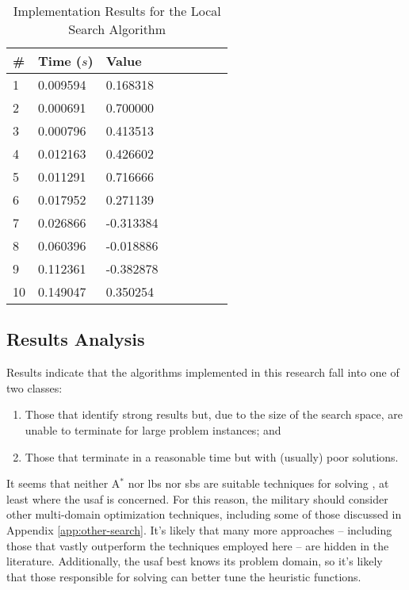 \documentclass[../main.tex]{subfiles}
\begin{document}
\begin{table*}
\caption{Implementation Results for the Local Search Algorithm}
\centering
\label{tab:loc-results}
\begin{tabular}{|l|l|l|l|l|l|l|l|}
\hline
\# & Time ($s$) & Value \\
\hline
1  & 0.009594 & 0.168318  \\
2  & 0.000691 & 0.700000  \\
3  & 0.000796 & 0.413513  \\
4  & 0.012163 & 0.426602  \\
5  & 0.011291 & 0.716666  \\
6  & 0.017952 & 0.271139  \\
7  & 0.026866 & -0.313384 \\
8  & 0.060396 & -0.018886 \\
9  & 0.112361 & -0.382878 \\
10 & 0.149047 & 0.350254  \\
\hline
\end{tabular}
\end{table*}

\subsection{Results Analysis}

Results indicate that the algorithms implemented in this research fall into one of two classes:

\begin{enumerate}
    \item Those that identify strong results but, due to the size of the search space, are unable to terminate for large problem instances; and
    \item Those that terminate in a reasonable time but with (usually) poor solutions.
\end{enumerate}

\noindent It seems that neither A$^*$ nor \ac{lbs} nor \ac{sbs} are suitable techniques for solving \prob, at least where the \ac{usaf} is concerned. For this reason, the military should consider other multi-domain optimization techniques, including some of those discussed in Appendix \ref{app:other-search}. It's likely that many more approaches -- including those that vastly outperform the techniques employed here -- are hidden in the literature. Additionally, the \ac{usaf} best knows its problem domain, so it's likely that those responsible for solving \probs can better tune the heuristic functions.
\end{document}
